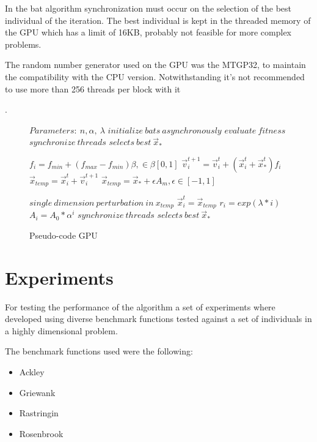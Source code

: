 \documentclass[conference]{IEEEtran}
\begin{document}
In the bat algorithm synchronization must occur on the selection of the
best individual of the iteration. The best individual is kept in the
threaded memory of the GPU which has a limit of 16KB, probably not feasible for
more complex problems.

The random number generator used on the GPU was the MTGP32, to
maintain the compatibility with the CPU version. Notwithstanding
it's not recommended to use more than 256 threads per block with it

\cite{curandIssue}.


\begin{figure}
\begin{algorithmic}[1]
\State $Parameters:\ n,\alpha,\ \lambda$
\State $initialize\ bats\ asynchronously$
\State $evaluate\ fitness$
\State $synchronize\ threads$
\State $selects\ best\ \vec{x}_*$

        \State $f_i=f_{min} + (f_{max} - f_{min})\beta, \in \beta [0,1]$
        \State $\vec{v}_i^{t+1} = \vec{v}_i^{t} + (\vec{x}_i^{t} + \vec{x}_*^{t})f_i$
        \State $\vec{x}_{temp} = \vec{x}_i^{t} + \vec{v}_i^{t+1}$
            \State $\vec{x}_{temp} = \vec{x}_* + \epsilon A_m, \epsilon \in [-1, 1]$
        \EndIf

        \State $single\ dimension\ perturbation\ in\ x_{temp}$
            \State $\vec{x}_i^t = \vec{x}_{temp}$
            \State $r_i = exp(\lambda * i)$
            \State $A_i =  A_{0} * \alpha^i$
        \EndIf
    \EndFor
    \State $synchronize\ threads$
    \State $selects\ best\ \vec{x}_*$
\EndWhile
\end{algorithmic}
\caption{Pseudo-code GPU}\label{gpu-pseudo}
\end{figure}

\section{Experiments} \label{experiments}%

For testing the performance of the algorithm a set of experiments where
developed using diverse benchmark functions tested against a set of
individuals in a highly dimensional problem.

The benchmark functions used were the following:

\begin{itemize}
    \item Ackley
    \item Griewank
    \item Rastringin
    \item Rosenbrook
\end{itemize}
\end{document}
